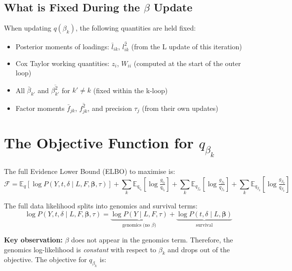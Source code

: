 \documentclass[11pt]{article}
\begin{document}
\subsection{What is Fixed During the $\beta$ Update}

When updating $q(\beta_k)$, the following quantities are held fixed:
\begin{itemize}
  \item Posterior moments of loadings: $\bar{l}_{ik}$, $\overline{l^2_{ik}}$ (from the L update of this iteration)
  \item Cox Taylor working quantities: $z_i$, $W_{ii}$ (computed at the start of the outer loop)
  \item All $\bar{\beta}_{k'}$ and $\overline{\beta^2_{k'}}$ for $k' \neq k$ (fixed within the k-loop)
  \item Factor moments $\bar{f}_{jk}$, $\overline{f^2_{jk}}$, and precision $\tau_j$ (from their own updates)
\end{itemize}

\section{The Objective Function for $q_{\beta_k}$}\label{sec:objective}

The full Evidence Lower Bound (ELBO) to maximise is:
\begin{equation}
  \mathcal{F} = \mathbb{E}_q[\log P(Y, t, \delta \mid L, F, \bm{\beta}, \tau)]
  + \sum_k \mathbb{E}_{q_{l_k}}\!\left[\log\tfrac{g_{l_k}}{q_{l_k}}\right]
  + \sum_k \mathbb{E}_{q_{f_k}}\!\left[\log\tfrac{g_{f_k}}{q_{f_k}}\right]
  + \sum_k \mathbb{E}_{q_{\beta_k}}\!\left[\log\tfrac{g_{\beta_k}}{q_{\beta_k}}\right]
  \label{eq:elbo-full}
\end{equation}

The full data likelihood splits into genomics and survival terms:
\begin{equation}
  \log P(Y, t, \delta \mid L, F, \bm{\beta}, \tau)
  = \underbrace{\log P(Y \mid L, F, \tau)}_{\text{genomics (no }\beta)}
  + \underbrace{\log P(t, \delta \mid L, \bm{\beta})}_{\text{survival}}
  \label{eq:likelihood-split}
\end{equation}

\textbf{Key observation:} $\beta$ does not appear in the genomics term.
Therefore, the genomics log-likelihood is \emph{constant} with respect to
$\beta_k$ and drops out of the objective.  The objective for
$q_{\beta_k}$ is:
\end{document}
